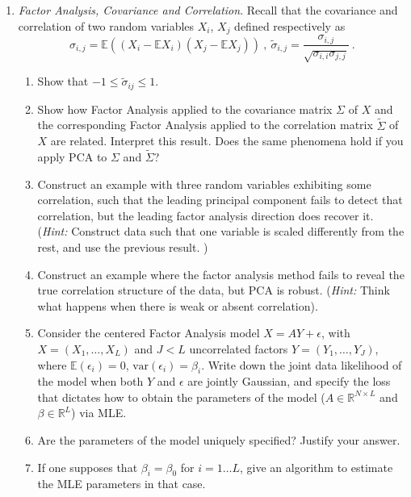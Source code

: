 \documentclass{article}
\newcommand{\E}{\mathbb{E}}
\newcommand{\R}{\mathbb{R}}
\begin{document}
\begin{enumerate}
\item \emph{Factor Analysis, Covariance and Correlation}. 
Recall that the covariance and correlation of two random variables $X_i$, $X_j$ defined respectively as 
$$\sigma_{i,j} = \E( (X_i - \E X_i)(X_j - \E X_j))~,~\tilde{\sigma}_{i,j} = \frac{\sigma_{i,j}}{\sqrt{\sigma_{i,i} \sigma_{j,j}}}~.$$
\begin{enumerate}
\item Show that $-1 \leq \tilde{\sigma}_{ij} \leq 1$.
\item Show how Factor Analysis applied to the covariance matrix $\Sigma$ of $X$ and the corresponding Factor Analysis applied to the correlation matrix $\tilde{\Sigma}$ of $X$ are related. Interpret this result. Does the same phenomena hold 
if you apply PCA to $\Sigma$ and  $\tilde{\Sigma}$? 
\item Construct an example with three random variables exhibiting some correlation, such that the leading principal component fails to detect that correlation, but the leading factor analysis direction does recover it. ({\it Hint:} Construct data such that one variable is scaled differently from the rest, and use the previous result. )
\item Construct an example where the factor analysis method fails to reveal the true correlation structure of the data, but PCA is robust. ({\it Hint:} Think what happens when there is weak or absent correlation).
\item Consider the centered Factor Analysis model $X = AY + \epsilon$, with $X=(X_1,\dots, X_L)$ and $J < L$ uncorrelated factors $Y=(Y_1,\dots,Y_J)$, where $\E(\epsilon_i)=0$, $\text{var}(\epsilon_i) = \beta_i$. 
 Write down the joint data likelihood of the model when both $Y$ and $\epsilon$ are jointly Gaussian, and specify the loss that dictates how to obtain the parameters of the model ($A \in \R^{N \times L}$ and $\beta \in \R^L$) via MLE. 
\item Are the parameters of the model uniquely specified? Justify your answer.
\item If one supposes that $\beta_i = \beta_0$ for $i=1\dots L$, give an algorithm to estimate the MLE parameters in that case.
\end{enumerate}



\end{enumerate}
\end{document}
